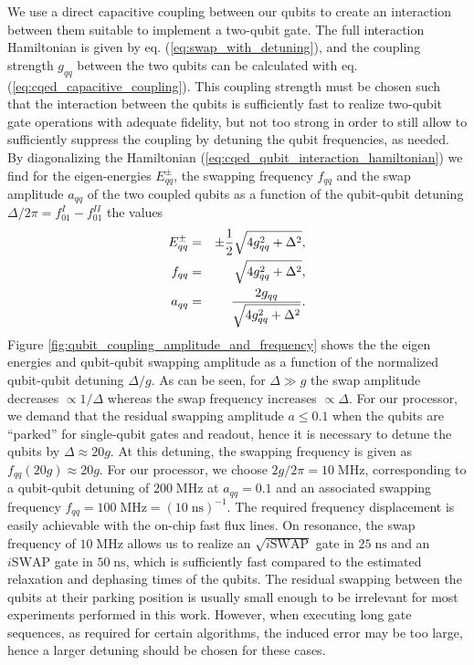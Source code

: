 We use a direct capacitive coupling between our qubits to create an interaction between them suitable to implement a two-qubit gate. The full interaction Hamiltonian is given by eq. (\ref{eq:swap_with_detuning}), and the coupling strength $g_{qq}$ between the two qubits can be calculated with eq. (\ref{eq:cqed_capacitive_coupling}). This coupling strength must be chosen such that the interaction between the qubits is sufficiently fast to realize two-qubit gate operations with adequate fidelity, but not too strong in order to still allow to sufficiently suppress the coupling by detuning the qubit frequencies, as needed. By diagonalizing the Hamiltonian (\ref{eq:cqed_qubit_interaction_hamiltonian}) we find for the eigen-energies $E_{qq}^\pm$, the swapping frequency $f_{qq}$ and the swap amplitude $a_{qq}$ of the two coupled qubits as a function of the qubit-qubit detuning $\Delta/2\pi=f_{01}^I-f_{01}^{II}$ the values
%
\begin{eqnarray}
E_{qq}^\pm & = & \pm\frac{1}{2}\sqrt{4g_{qq}^2+\Delta^2}, \notag \\
f_{qq}     & = & \sqrt{4g_{qq}^2+\Delta^2}, \notag \\
a_{qq}     & = & \frac{2g_{qq}}{\sqrt{4g_{qq}^2+\Delta^2}}. \label{eq:qubit_coupling_amplitude_and_frequency}
\end{eqnarray}
%
Figure \ref{fig:qubit_coupling_amplitude_and_frequency} shows the the eigen energies and qubit-qubit swapping amplitude as a function of the normalized qubit-qubit detuning $\Delta/g$. As can be seen, for $\Delta \gg g$ the swap amplitude decreases $\propto 1/\Delta$ whereas the swap frequency increases $\propto \Delta$. For our processor, we demand that the residual swapping amplitude $a\le 0.1$ when the qubits are ``parked'' for single-qubit gates and readout, hence it is necessary to detune the qubits by $\Delta \approx 20 g$. At this detuning, the swapping frequency is given as $f_{qq}(20 g)\approx 20 g$. For our processor, we choose $2g/2\pi = 10\;\mathrm{MHz}$, corresponding to a qubit-qubit detuning of $200\;\mathrm{MHz}$ at $a_{qq}=0.1$ and an associated swapping frequency $f_{qq}=100\;\mathrm{MHz}=(10\;\mathrm{ns})^{-1}$. The required frequency displacement is easily achievable with the on-chip fast flux lines. On resonance, the swap frequency of $10\;\mathrm{MHz}$ allows us to realize an $\sqrt{i\mathrm{SWAP}}$ gate in $25\;\mathrm{ns}$ and an $i\mathrm{SWAP}$ gate in $50\;\mathrm{ns}$, which is sufficiently fast compared to the estimated relaxation and dephasing times of the qubits. The residual swapping between the qubits at their parking position is usually small enough to be irrelevant for most experiments performed in this work. However, when executing long gate sequences, as required for certain algorithms, the induced error may be too large, hence a larger detuning should be chosen for these cases.

